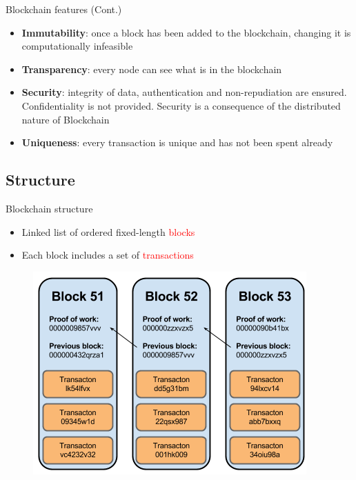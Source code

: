 \documentclass{beamer}
\newcommand\red[1]{\textcolor{red}{#1}}
\begin{document}
  \begin{frame}{Blockchain features (Cont.)}
    \begin{itemize}
      \item \textbf{Immutability}: once a block has been added to the blockchain,
      changing it is computationally infeasible \pause
      \item \textbf{Transparency}: every node can see what is in the blockchain \pause
      \item \textbf{Security}: integrity of data, authentication and non-repudiation
      are ensured. Confidentiality is not provided. Security is a consequence of
      the distributed nature of Blockchain \pause
      \item \textbf{Uniqueness}: every transaction is unique and has not been spent already
    \end{itemize}
  \end{frame}



  \subsection{Structure}
  \begin{frame}{Blockchain structure}
    \begin{itemize}
      \item Linked list of ordered fixed-length \red{blocks}
      \item Each block includes a set of \red{transactions}
    \end{itemize}

    \begin{figure}[!htb]
      \centering
      \includegraphics[width=0.45\linewidth]{../img/blockchain-basic-schema.png}
    \end{figure}
  \end{frame}
\end{document}
